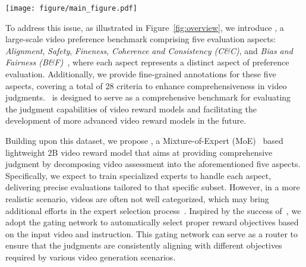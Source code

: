 \begin{figure*}[t]
    \centering
    \texttt{[image: figure/main\_figure.pdf]}
    \vspace{-1.5em}
    \caption{\datasetname is a comprehensive and fine-grained large-scale video preference dataset, which includes five aspects: \textit{Alignment}, \textit{Safety}, \textit{Fineness}, \textit{Coherence and Consistency} (C\&C), and \textit{Bias and Fairness} (B\&F). Each aspect contains multiple detailed criteria to facilitate a thorough preference evaluation from different perspectives.}
    \label{fig:overview}
    \vspace{-1em}
\end{figure*}

To address this issue, as illustrated in Figure~\ref{fig:overview}, we introduce \datasetname, a large-scale video preference benchmark comprising five evaluation aspects: \textit{Alignment}, \textit{Safety}, \textit{Fineness}, \textit{Coherence and Consistency (C\&C)}, and \textit{Bias and Fairness (B\&F)}~\citep{chen2024mjbenchmultimodalrewardmodel, wang2024decodingtrustcomprehensiveassessmenttrustworthiness}, where each aspect represents a distinct aspect of preference evaluation. Additionally, we provide fine-grained annotations for these five aspects, covering a total of 28 criteria to enhance comprehensiveness in video judgments. \datasetname\ is designed to serve as a comprehensive benchmark for evaluating the judgment capabilities of video reward models and facilitating the development of more advanced video reward models in the future.

Building upon this dataset, we propose \algname, a Mixture-of-Expert (MoE)~\citep{cai2024surveymixtureexperts} based lightweight 2B video reward model that aims at providing comprehensive judgment by decomposing video assessment into the aforementioned five aspects.
Specifically, we expect to train specialized experts to handle each aspect, delivering precise evaluations tailored to that specific subset. 
However, in a more realistic scenario, videos are often not well categorized, which may bring additional efforts in the expert selection process~\cite{shazeer2017outrageouslylargeneuralnetworks, zhou2022mixtureofexpertsexpertchoicerouting}.
Inspired by the success of~\citet{armoreward}, we adopt the gating network to automatically select proper reward objectives based on the input video and instruction. This gating network can serve as a router to ensure that the judgments are consistently aligning with different objectives required by various video generation scenarios.

